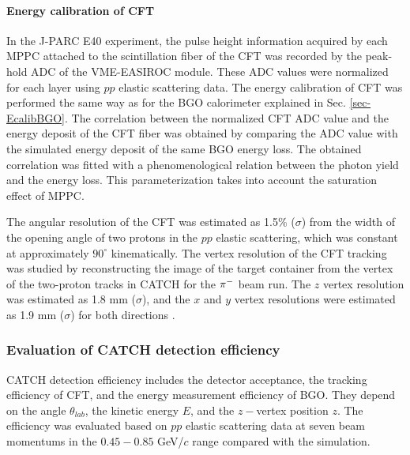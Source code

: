 \paragraph{Energy calibration of CFT}
In the J-PARC E40 experiment, the pulse height information acquired by each MPPC attached to the scintillation fiber of the CFT was recorded by the peak-hold ADC of the VME-EASIROC module. These ADC values were normalized for each layer using $pp$ elastic scattering data. The energy calibration of CFT was performed the same way as for the BGO calorimeter explained in Sec. \ref{sec-EcalibBGO}. The correlation between the normalized CFT ADC value and the energy deposit of the CFT fiber was obtained by comparing the ADC value with the simulated energy deposit of the same BGO energy loss. The obtained correlation was fitted with a phenomenological relation between the photon yield and the energy loss.
This parameterization takes into account the saturation effect of MPPC. 

The angular resolution of the CFT was estimated as 1.5\% ($\sigma$) from the width of the opening angle of two protons in the $pp$ elastic scattering, which was constant at approximately $90^{\circ}$ kinematically. The vertex resolution of the CFT tracking was studied by reconstructing the image of the target container from the vertex of the two-proton tracks in CATCH for the $\pi^{-}$ beam run. The $z$ vertex resolution was estimated as 1.8 mm ($\sigma$), and the $x$ and $y$ vertex resolutions were estimated as 1.9 mm ($\sigma$) for both directions \cite{Miwa-SMp}. 


\subsubsection{Evaluation of CATCH detection efficiency}
\label{subsubsec-evaCATCHeff}

CATCH detection efficiency includes the detector acceptance, the tracking efficiency of CFT, and the energy measurement efficiency of BGO. They depend on the angle $\theta_{lab}$, the kinetic energy $E$, and the $z-$vertex position $z$. The efficiency was evaluated based on $pp$ elastic scattering data at seven beam momentums in the $0.45-0.85$ GeV/$c$ range compared with the simulation. 

